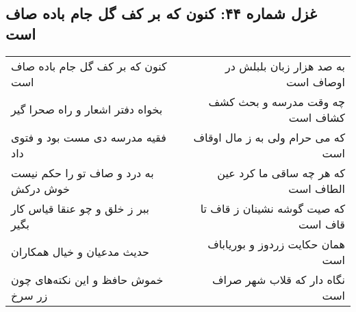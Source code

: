 \begin{center}
\section*{غزل شماره ۴۴: کنون که بر کف گل جام باده صاف است}
\label{sec:sh044}
\begin{longtable}{l p{0.5cm} r}
کنون که بر کف گل جام باده صاف است
&&
به صد هزار زبان بلبلش در اوصاف است
\\
بخواه دفتر اشعار و راه صحرا گیر
&&
چه وقت مدرسه و بحث کشف کشاف است
\\
فقیه مدرسه دی مست بود و فتوی داد
&&
که می حرام ولی به ز مال اوقاف است
\\
به درد و صاف تو را حکم نیست خوش درکش
&&
که هر چه ساقی ما کرد عین الطاف است
\\
ببر ز خلق و چو عنقا قیاس کار بگیر
&&
که صیت گوشه نشینان ز قاف تا قاف است
\\
حدیث مدعیان و خیال همکاران
&&
همان حکایت زردوز و بوریاباف است
\\
خموش حافظ و این نکته‌های چون زر سرخ
&&
نگاه دار که قلاب شهر صراف است
\\
\end{longtable}
\end{center}
